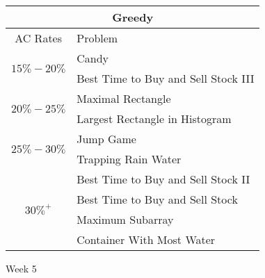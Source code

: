 \documentclass[paper=a4, fontsize=11pt]{scrartcl} %
\begin{document}
\begin{center}
  \vspace{10mm}

  \begin{tabular}{|c|l|}
      \hline
      \multicolumn{2}{|c|}{Greedy} \\
      \hline
      AC Rates      &   Problem     \\
      \hline
      \multirow{2}{*}{$15\%-20\%$}  &    Candy  \\
          & Best Time to Buy and Sell Stock III \\
      \hline
      \multirow{2}{*}{$20\%-25\%$}  &    Maximal Rectangle  \\
          & Largest Rectangle in Histogram  \\
      \hline
      \multirow{2}{*}{$25\%-30\%$}  &    Jump Game  \\
          & Trapping Rain Water \\
      \hline
      \multirow{4}{*}{$30\%^+$}  &  Best Time to Buy and Sell Stock II \\
          & Best Time to Buy and Sell Stock \\
          & Maximum Subarray  \\
          & Container With Most Water \\
      \hline
  \end{tabular}

  \pagebreak

  \begin{center}
    Week 5
  \end{center}


\end{center}
\end{document}
